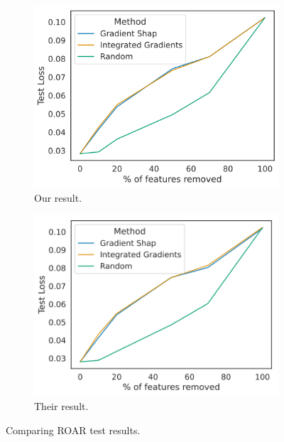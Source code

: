 \begin{figure}[H]
     \centering
     \begin{subfigure}[b]{0.45\textwidth}
         \centering
         \includegraphics[width=\textwidth]{images/roar_us.png}
         \caption{Our result.}
         \label{fig:mnist}
     \end{subfigure}
     \hfill
     \begin{subfigure}[b]{0.45\textwidth}
         \centering
         \includegraphics[width=\textwidth]{images/roar_them.png}
         \caption{Their result.}
         \label{fig:ecg}
     \end{subfigure}
     \hfill
    \caption{Comparing ROAR test results.}
    \label{fig:roar_test_result}
\end{figure}

